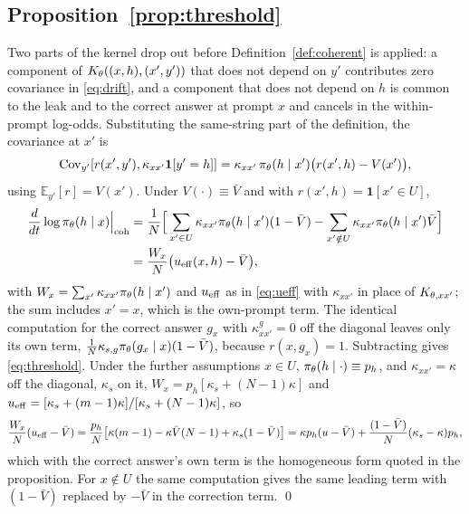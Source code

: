\subsection{Proposition~\ref{prop:threshold}}

Two parts of the kernel drop out before Definition~\ref{def:coherent} is applied: a component of $K_\theta((x,h),(x',y'))$ that does not depend on $y'$ contributes zero covariance in \eqref{eq:drift}, and a component that does not depend on $h$ is common to the leak and to the correct answer at prompt $x$ and cancels in the within-prompt log-odds. Substituting the same-string part of the definition, the covariance at $x'$ is
\[
\operatorname{Cov}_{y'}[r(x',y'),\kappa_{xx'}\mathbf{1}[y'=h]] = \kappa_{xx'}\,\pi_\theta(h\mid x')\big(r(x',h)-V(x')\big),
\]
using $\mathbb{E}_{y'}[r]=V(x')$. Under $V(\cdot)\equiv\bar V$ and with $r(x',h)=\mathbf{1}[x'\in U]$,
\[
\begin{aligned}
\frac{d}{dt}\log\pi_\theta(h\mid x)\Big|_{\mathrm{coh}}
&=\frac{1}{N}\Big[\sum_{x'\in U}\kappa_{xx'}\pi_\theta(h\mid x')(1-\bar V)-\sum_{x'\notin U}\kappa_{xx'}\pi_\theta(h\mid x')\bar V\Big]\\
&=\frac{W_x}{N}\big(u_{\mathrm{eff}}(x,h)-\bar V\big),
\end{aligned}
\]
with $W_x=\sum_{x'}\kappa_{xx'}\pi_\theta(h\mid x')$ and $u_{\mathrm{eff}}$ as in \eqref{eq:ueff} with $\kappa_{xx'}$ in place of $K_{\theta,xx'}$; the sum includes $x'=x$, which is the own-prompt term. The identical computation for the correct answer $g_x$ with $\kappa^g_{xx'}=0$ off the diagonal leaves only its own term, $\frac1N\kappa_{s,g}\pi_\theta(g_x\mid x)(1-\bar V)$, because $r(x,g_x)=1$. Subtracting gives \eqref{eq:threshold}. Under the further assumptions $x\in U$, $\pi_\theta(h\mid\cdot)\equiv p_h$, and $\kappa_{xx'}=\kappa$ off the diagonal, $\kappa_s$ on it, $W_x=p_h[\kappa_s+(N-1)\kappa]$ and $u_{\mathrm{eff}}=[\kappa_s+(m-1)\kappa]/[\kappa_s+(N-1)\kappa]$, so
\[
\frac{W_x}{N}(u_{\mathrm{eff}}-\bar V)=\frac{p_h}{N}\big[\kappa(m-1)-\kappa\bar V(N-1)+\kappa_s(1-\bar V)\big]
=\kappa p_h(u-\bar V)+\frac{(1-\bar V)}{N}(\kappa_s-\kappa)p_h,
\]
which with the correct answer's own term is the homogeneous form quoted in the proposition. For $x\notin U$ the same computation gives the same leading term with $(1-\bar V)$ replaced by $-\bar V$ in the correction term. \qed

